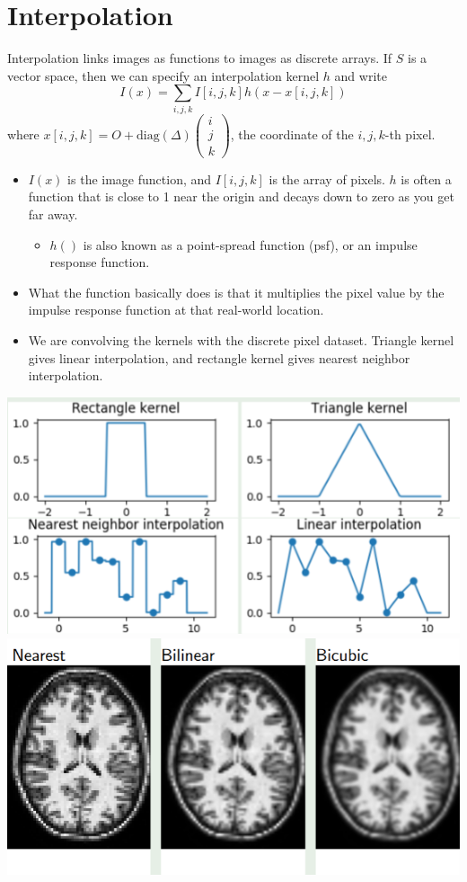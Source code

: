 \documentclass[10pt]{article}
\begin{document}
\section*{Interpolation}
Interpolation links images as functions to images as discrete arrays.  If $S$ is a vector space, then we can specify an interpolation kernel $h$ and write
\[I(x) = \sum_{i, j, k} I[i, j, k] h(x - x[i, j, k])\]
where $x[i, j, k] = O + \text{diag}(\Delta)\begin{pmatrix} i \\ j \\ k \end{pmatrix}$, the coordinate of the $i, j, k$-th pixel.
\begin{itemize}
    \item $I(x)$ is the image function, and $I[i, j, k]$ is the array of pixels.  $h$ is often a function that is close to 1 near the origin and decays down to zero as you get far away.  
    \begin{itemize}
        \item $h()$ is also known as a point-spread function (psf), or an impulse response function.
    \end{itemize}
    \item What the function basically does is that it multiplies the pixel value by the impulse response function at that real-world location.
    \item We are convolving the kernels with the discrete pixel dataset.  Triangle kernel gives linear interpolation, and rectangle kernel gives nearest neighbor interpolation.
\end{itemize}
\begin{center}
    \includegraphics*[scale=1]{W1_6.png}
    \includegraphics*[scale=1]{W1_7.png}
\end{center}
\end{document}

